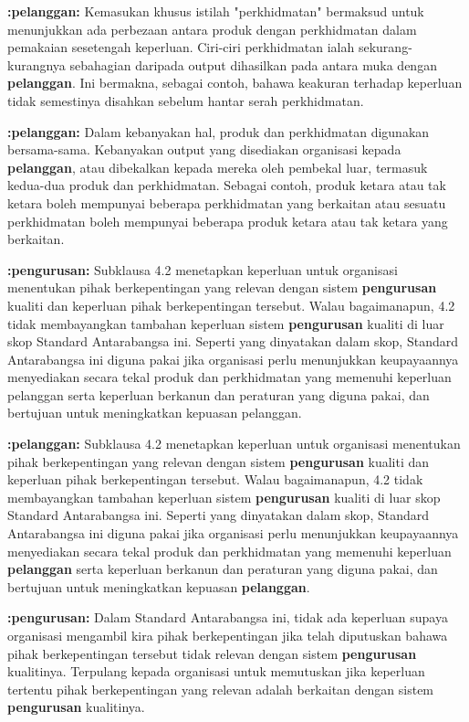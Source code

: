 \documentclass{article}
\begin{document}
\textbf{:pelanggan:} Kemasukan khusus istilah "perkhidmatan" bermaksud untuk menunjukkan ada perbezaan
antara produk dengan perkhidmatan dalam pemakaian sesetengah keperluan. Ciri-ciri
perkhidmatan ialah sekurang-kurangnya sebahagian daripada output dihasilkan pada antara
muka dengan \textbf{pelanggan}. Ini bermakna, sebagai contoh, bahawa keakuran terhadap
keperluan tidak semestinya disahkan sebelum hantar serah perkhidmatan.

\textbf{:pelanggan:} Dalam kebanyakan hal, produk dan perkhidmatan digunakan bersama-sama. Kebanyakan
output yang disediakan organisasi kepada \textbf{pelanggan}, atau dibekalkan kepada mereka oleh
pembekal luar, termasuk kedua-dua produk dan perkhidmatan. Sebagai contoh, produk
ketara atau tak ketara boleh mempunyai beberapa perkhidmatan yang berkaitan atau sesuatu
perkhidmatan boleh mempunyai beberapa produk ketara atau tak ketara yang berkaitan.

\textbf{:pengurusan:} Subklausa 4.2 menetapkan keperluan untuk organisasi menentukan pihak berkepentingan
yang relevan dengan sistem \textbf{pengurusan} kualiti dan keperluan pihak berkepentingan tersebut.
Walau bagaimanapun, 4.2 tidak membayangkan tambahan keperluan sistem \textbf{pengurusan}
kualiti di luar skop Standard Antarabangsa ini. Seperti yang dinyatakan dalam skop, Standard
Antarabangsa ini diguna pakai jika organisasi perlu menunjukkan keupayaannya
menyediakan secara tekal produk dan perkhidmatan yang memenuhi keperluan pelanggan
serta keperluan berkanun dan peraturan yang diguna pakai, dan bertujuan untuk
meningkatkan kepuasan pelanggan.

\textbf{:pelanggan:} Subklausa 4.2 menetapkan keperluan untuk organisasi menentukan pihak berkepentingan
yang relevan dengan sistem \textbf{pengurusan} kualiti dan keperluan pihak berkepentingan tersebut.
Walau bagaimanapun, 4.2 tidak membayangkan tambahan keperluan sistem \textbf{pengurusan}
kualiti di luar skop Standard Antarabangsa ini. Seperti yang dinyatakan dalam skop, Standard
Antarabangsa ini diguna pakai jika organisasi perlu menunjukkan keupayaannya
menyediakan secara tekal produk dan perkhidmatan yang memenuhi keperluan \textbf{pelanggan}
serta keperluan berkanun dan peraturan yang diguna pakai, dan bertujuan untuk
meningkatkan kepuasan \textbf{pelanggan}.

\textbf{:pengurusan:} Dalam Standard Antarabangsa ini, tidak ada keperluan supaya organisasi mengambil kira
pihak berkepentingan jika telah diputuskan bahawa pihak berkepentingan tersebut tidak
relevan dengan sistem \textbf{pengurusan} kualitinya. Terpulang kepada organisasi untuk
memutuskan jika keperluan tertentu pihak berkepentingan yang relevan adalah berkaitan
dengan sistem \textbf{pengurusan} kualitinya.
\end{document}
